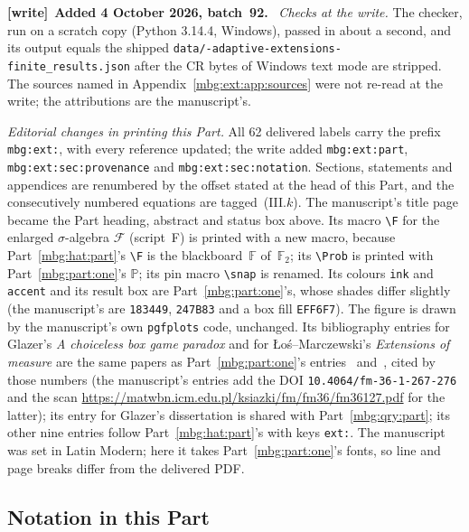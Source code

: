 \documentclass[11pt,letterpaper]{article}
\theoremstyle{definition}
\newcommand{\Prb}{\mathbb P}
\newcommand{\F}{\mathbb F}
\newcommand{\Fext}{\mathcal F}
\newenvironment{writenote}[1][]{\par\smallskip\begingroup\small
 \noindent\textbf{[write]}\if\relax\detokenize{#1}\relax\else~\textbf{#1.}\fi\ }%
 {\par\endgroup\smallskip}
\begin{document}
\begin{writenote}[Added 4 October 2026, batch~92]
\emph{Checks at the write.} The checker, run on a scratch copy (Python 3.14.4, Windows), passed in about a second, and its output equals the shipped \texttt{data/-\allowbreak adaptive-\allowbreak extensions-\allowbreak finite\_\allowbreak results.json} after the CR bytes of Windows text mode are stripped. The sources named in Appendix~\ref{mbg:ext:app:sources} were not re-read at the write; the attributions are the manuscript's.

\emph{Editorial changes in printing this Part.} All 62 delivered labels carry the prefix \texttt{mbg:ext:}, with every reference updated; the write added \texttt{mbg:ext:part}, \texttt{mbg:ext:sec:provenance} and \texttt{mbg:ext:sec:notation}. Sections, statements and appendices are renumbered by the offset stated at the head of this Part, and the consecutively numbered equations are tagged~(III.$k$). The manuscript's title page became the Part heading, abstract and status box above. Its macro \texttt{\textbackslash F} for the enlarged $\sigma$-algebra $\Fext$ (script~F) is printed with a new macro, because Part~\ref{mbg:hat:part}'s \texttt{\textbackslash F} is the blackboard~$\F$ of~$\F_2$; its \texttt{\textbackslash Prob} is printed with Part~\ref{mbg:part:one}'s $\Prb$; its pin macro \texttt{\textbackslash snap} is renamed. Its colours \texttt{ink} and \texttt{accent} and its result box are Part~\ref{mbg:part:one}'s, whose shades differ slightly (the manuscript's are \texttt{183449}, \texttt{247B83} and a box fill \texttt{EFF6F7}). The figure is drawn by the manuscript's own \texttt{pgfplots} code, unchanged. Its bibliography entries for Glazer's \emph{A choiceless box game paradox} and for \L o\'s--Marczewski's \emph{Extensions of measure} are the same papers as Part~\ref{mbg:part:one}'s entries~\cite{GlazerBox} and~\cite{LosMarczewski}, cited by those numbers (the manuscript's entries add the DOI \nolinkurl{10.4064/fm-36-1-267-276} and the scan \url{https://matwbn.icm.edu.pl/ksiazki/fm/fm36/fm36127.pdf} for the latter); its entry for Glazer's dissertation is shared with Part~\ref{mbg:qry:part}; its other nine entries follow Part~\ref{mbg:hat:part}'s with keys \texttt{ext:}. The manuscript was set in Latin Modern; here it takes Part~\ref{mbg:part:one}'s fonts, so line and page breaks differ from the delivered PDF.
\end{writenote}

\subsection{Notation in this Part}
\label{mbg:ext:sec:notation}
\end{document}
